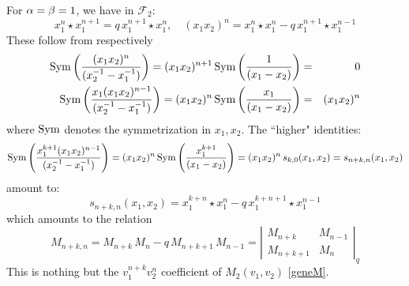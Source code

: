 \begin{example}
For ${\alpha}=\beta=1$, we have in ${\mathcal F}_{2}$:
$$x_1^n\star x_1^{n+1}=q\,x_1^{n+1}\star x_1^n,\quad (x_1x_2)^n=x_1^n\star x_1^n-q \,x_1^{n+1}\star x_1^{n-1}$$
These follow from respectively
\begin{eqnarray*}
{\rm Sym}\left( \frac{(x_1x_2)^n}{(x_2^{-1}-x_1^{-1})} \right)=
(x_1x_2)^{n+1}\,{\rm Sym}\left( \frac{1}{(x_1-x_2)} \right)&=& 0\\
{\rm Sym}\left( \frac{x_1(x_1x_2)^{n-1}}{(x_2^{-1}-x_1^{-1})} \right)=
(x_1x_2)^{n}\,{\rm Sym}\left( \frac{x_1}{(x_1-x_2)} \right)&=& (x_1x_2)^{n}
\end{eqnarray*}
where ${\rm Sym}$ denotes the symmetrization in $x_1,x_2$. The ``higher" identities:
$${\rm Sym}\left( \frac{x_1^{k+1}(x_1x_2)^{n-1}}{(x_2^{-1}-x_1^{-1})} \right)=
(x_1x_2)^{n}\,{\rm Sym}\left( \frac{x_1^{k+1}}{(x_1-x_2)} \right)=(x_1x_2)^{n}\,s_{k,0}(x_1,x_2)=s_{n+k,n}(x_1,x_2)$$
amount to:
$$ s_{n+k,n}(x_1,x_2)=x_1^{k+n}\star x_1^{n}-q \,x_1^{k+n+1}\star x_1^{n-1}$$
which amounts to the relation
$$M_{n+k,n}=M_{n+k}\, M_n-q \, M_{n+k+1}\, M_{n-1}=
\left\vert \begin{matrix}M_{n+k} & M_{n-1}\\ M_{n+k+1} & M_{n}\end{matrix}\right\vert_q$$
This is nothing but the $v_1^{n+k}v_2^n$ coefficient of $M_2(v_1,v_2)$ \eqref{geneM}.
\end{example}




